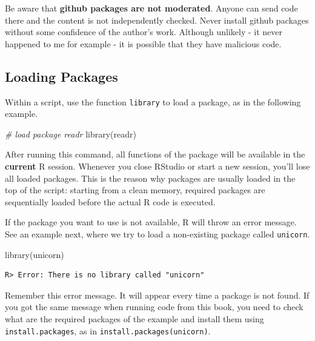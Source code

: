 \documentclass[
  12pt,
]{book}
\newenvironment{Shaded}{\begin{snugshade}}{\end{snugshade}}
\newcommand{\CommentTok}[1]{\textcolor[rgb]{0.37,0.37,0.37}{\textit{#1}}}
\newcommand{\FunctionTok}[1]{\textcolor[rgb]{0,0,0}{#1}}
\newcommand{\NormalTok}[1]{#1}
\newenvironment{rmdcaution}
{\begin{cautionblock}
		
	} {\end{cautionblock}}
\begin{document}
\begin{rmdcaution}
Be aware that \textbf{github packages are not moderated}. Anyone can
send code there and the content is not independently checked. Never
install github packages without some confidence of the author's work.
Although unlikely - it never happened to me for example - it is possible
that they have malicious code.
\end{rmdcaution}

\hypertarget{loading-packages}{%
\subsection{Loading Packages}\label{loading-packages}}

Within a script, use the function \texttt{library} to load a package, as in the following example. 

\begin{Shaded}
\begin{Highlighting}[]
\CommentTok{\# load package readr}
\FunctionTok{library}\NormalTok{(readr)}
\end{Highlighting}
\end{Shaded}

After running this command, all functions of the package will be available in the \textbf{current} R session. Whenever you close RStudio or start a new session, you'll lose all loaded packages. This is the reason why packages are usually loaded in the top of the script: starting from a clean memory, required packages are sequentially loaded before the actual R code is executed.

If the package you want to use is not available, R will throw an error message. See an example next, where we try to load a non-existing package called \texttt{unicorn}.

\begin{Shaded}
\begin{Highlighting}[]
\FunctionTok{library}\NormalTok{(unicorn)}
\end{Highlighting}
\end{Shaded}

\begin{verbatim}
R> Error: There is no library called "unicorn"
\end{verbatim}

Remember this error message. It will appear every time a package is not found. If you got the same message when running code from this book, you need to check what are the required packages of the example and install them using \texttt{install.packages}, as in \texttt{install.packages(\textquotesingle{}unicorn\textquotesingle{})}.
\end{document}
